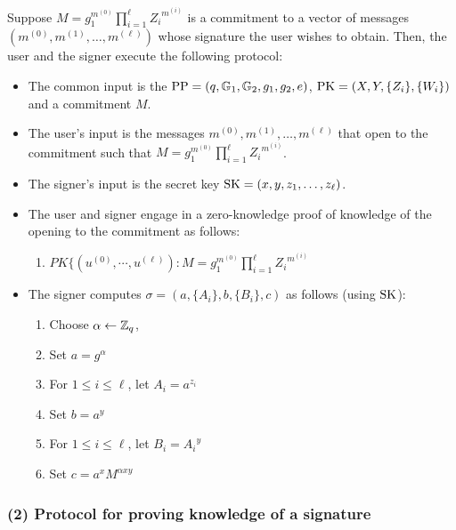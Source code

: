 \documentclass[11pt]{report}
\begin{document}
Suppose $M = g_1 ^ {m^{(0)}} \prod_{i=1}^{\ell} {Z_i}^{m^{(i)}}$ is a commitment to a vector of messages $(m^{(0)}, m^{(1)}, \dots, m^{(\ell)})$ whose signature the user wishes to obtain. Then, the user and the signer execute the following protocol:
\begin{itemize}
\item The common input is the $\mathrm{PP} = (q, \mathbb{G}_1, \mathbb{G}_2, g_1, g_2, e)$,  $\mathrm{PK} = (X, Y, \{Z_i\}, \{W_i\})$ and a commitment $M$.
\item The user's input is the messages $m^{(0)}, m^{(1)}, \dots, m^{(\ell)}$ that open to the commitment such that $M = g_1 ^ {m^{(0)}} \prod_{i=1}^{\ell} {Z_i}^{m^{(i)}}$.
\item The signer's input is the secret key $\mathrm{SK} = (x, y, {z_1, \dots, z_\ell})$.
\item The user and signer engage in a zero-knowledge proof of knowledge of the opening to the commitment as follows:
\begin{enumerate}
\item $PK \{ (u^{(0)}, \cdots, u^{(\ell)}): M = g_1 ^ {m^{(0)}} \prod_{i=1}^{\ell} {Z_i}^{m^{(i)}}$
\end{enumerate}
\item The signer computes $\sigma = (a, \{A_i\}, b, \{B_i\}, c)$ as follows (using $\mathrm{SK}$):
\begin{enumerate}
\item Choose $\alpha \leftarrow \mathbb{Z}_q$, 
\item Set $a = g^\alpha$
\item For $1 \le i \le \ell$, let $A_i = a^{z_i}$
\item Set $b = a^y$
\item For $1 \le i \le \ell$, let $B_i = {A_i}^y$
\item Set $c = a^x M^{\alpha xy}$
\end{enumerate}
\end{itemize}

\subsubsection{(2) Protocol for proving knowledge of a signature}
\label{sec:blindsigs}
\end{document}
